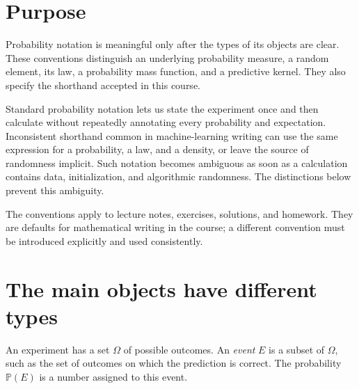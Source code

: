 \documentclass[11pt]{article}
\renewcommand{\P}{\mathbb P}
\begin{document}
\begin{center}
\end{center}

\section{Purpose}

Probability notation is meaningful only after the types of its objects are
clear. These conventions distinguish an underlying probability measure, a
random element, its law, a probability mass function, and a predictive
kernel. They also specify the shorthand accepted in this course.

Standard probability notation lets us state the experiment once and then
calculate without repeatedly annotating every probability and expectation.
Inconsistent shorthand common in machine-learning writing can use the same
expression for a probability, a law, and a density, or leave the source of
randomness implicit. Such notation becomes ambiguous as soon as a calculation
contains data, initialization, and algorithmic randomness. The distinctions
below prevent this ambiguity.

The conventions apply to lecture notes, exercises, solutions, and homework.
They are defaults for mathematical writing in the course; a different
convention must be introduced explicitly and used consistently.

\section{The main objects have different types}

An experiment has a set \(\Omega\) of possible outcomes. An \emph{event}
\(E\) is a subset of \(\Omega\), such as the set of outcomes on which the
prediction is correct. The probability \(\P(E)\) is a number assigned to this
event.
\end{document}
